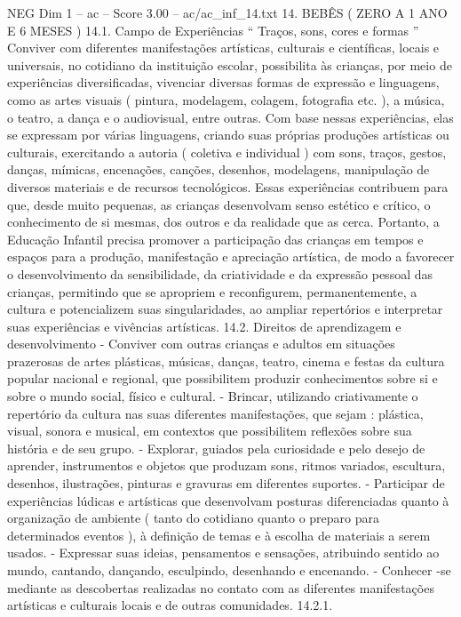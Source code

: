 \begin{textsample}{NEG Dim 1 – ac – Score 3.00 – ac/ac\_inf\_14.txt}  \label{ex:f1_neg_114}
14.
BEBÊS ( ZERO A 1 ANO E 6 MESES ) 14.1.
Campo de Experiências “ Traços, sons, cores e formas ” Conviver com diferentes manifestações artísticas, culturais e científicas, locais e universais, no cotidiano da instituição escolar, possibilita às crianças, por meio de experiências diversificadas, vivenciar diversas formas de expressão e linguagens, como as artes visuais ( pintura, modelagem, colagem, fotografia etc. ), a música, o teatro, a dança e o audiovisual, entre outras.
Com base nessas experiências, elas se expressam por várias linguagens, criando suas próprias produções artísticas ou culturais, exercitando a autoria ( coletiva e individual ) com sons, traços, gestos, danças, mímicas, encenações, canções, desenhos, modelagens, manipulação de diversos materiais e de recursos tecnológicos.
Essas experiências contribuem para que, desde muito pequenas, as crianças desenvolvam senso estético e crítico, o conhecimento de si mesmas, dos outros e da realidade que as cerca.
Portanto, a Educação Infantil precisa promover a participação das crianças em tempos e espaços para a produção, manifestação e apreciação artística, de modo a favorecer o desenvolvimento da sensibilidade, da criatividade e da expressão pessoal das crianças, permitindo que se apropriem e reconfigurem, permanentemente, a cultura e potencializem suas singularidades, ao ampliar repertórios e interpretar suas experiências e vivências artísticas. 14.2.
Direitos de aprendizagem e desenvolvimento - Conviver com outras crianças e adultos em situações prazerosas de artes plásticas, músicas, danças, teatro, cinema e festas da cultura popular nacional e regional, que possibilitem produzir conhecimentos sobre si e sobre o mundo social, físico e cultural. - Brincar, utilizando criativamente o repertório da cultura nas suas diferentes manifestações, que sejam : plástica, visual, sonora e musical, em contextos que possibilitem reflexões sobre sua história e de seu grupo. - Explorar, guiados pela curiosidade e pelo desejo de aprender, instrumentos e objetos que produzam sons, ritmos variados, escultura, desenhos, ilustrações, pinturas e gravuras em diferentes suportes. - Participar de experiências lúdicas e artísticas que desenvolvam posturas diferenciadas quanto à organização de ambiente ( tanto do cotidiano quanto o preparo para determinados eventos ), à definição de temas e à escolha de materiais a serem usados. - Expressar suas ideias, pensamentos e sensações, atribuindo sentido ao mundo, cantando, dançando, esculpindo, desenhando e encenando. - Conhecer -se mediante as descobertas realizadas no contato com as diferentes manifestações artísticas e culturais locais e de outras comunidades. 14.2.1.

\end{textsample}
